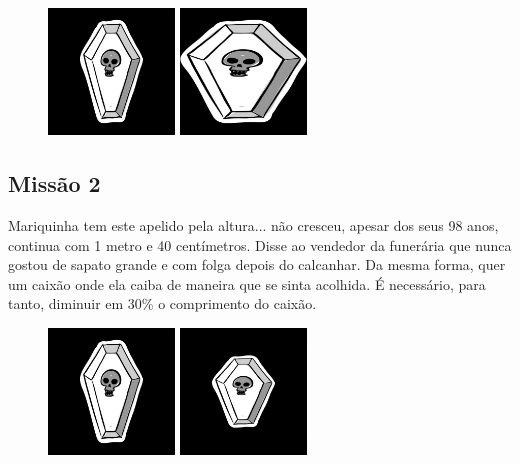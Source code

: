 \documentclass[
	12pt,				%
	oneside,			%
	a4paper,			%
	english,			%
	french,				%
	spanish,			%
	brazil,				%
	]{abntex2}
\begin{document}
\begin{apendicesenv}
\begin{figure}[ht]
\centering
\includegraphics[width=0.3\textwidth]{imagens/desafios/coffin2dcenter.jpg}
\includegraphics[width=0.3\textwidth]{imagens/desafios/mission1.png}
\end{figure}

\subsection{Missão 2}

Mariquinha tem este apelido pela altura... não cresceu, apesar dos seus 98 anos, continua com 1 metro e 40 centímetros. Disse ao vendedor da funerária que nunca gostou de sapato grande e com folga depois do calcanhar. Da mesma forma, quer um caixão onde ela caiba de maneira que se sinta acolhida. É necessário, para tanto, diminuir em 30\% o comprimento do caixão.

\begin{figure}[ht]
\centering
\includegraphics[width=0.3\textwidth]{imagens/desafios/coffin2dcenter.jpg}
\includegraphics[width=0.3\textwidth]{imagens/desafios/mission2.png}
\end{figure}


\end{apendicesenv}
\end{document}
